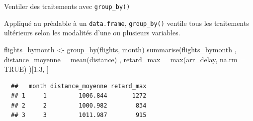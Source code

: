 \documentclass[12pt,ignorenonframetext,]{beamer}
\newenvironment{Shaded}{}{}
\newcommand{\DataTypeTok}[1]{#1}
\newcommand{\DecValTok}[1]{#1}
\newcommand{\KeywordTok}[1]{\textcolor[rgb]{0.00,0.00,1.00}{#1}}
\newcommand{\NormalTok}[1]{#1}
\newcommand{\OperatorTok}[1]{#1}
\newcommand{\OtherTok}[1]{\textcolor[rgb]{1.00,0.25,0.00}{#1}}
\newcommand{\StringTok}[1]{\textcolor[rgb]{0.00,0.50,0.50}{#1}}
\renewenvironment{Shaded}{\begin{snugshade}}{\end{snugshade}}
\begin{document}
\begin{frame}[fragile]{Ventiler des traitements avec
\texttt{group\_by()}}
\protect\hypertarget{ventiler-des-traitements-avec-group_by}{}

Appliqué au préalable à un \texttt{data.frame}, \texttt{group\_by()}
ventile tous les traitements ultérieurs selon les modalités d’une ou
plusieurs variables.

\begin{Shaded}
\begin{Highlighting}[]
\NormalTok{flights_bymonth <-}\StringTok{ }\KeywordTok{group_by}\NormalTok{(flights, month)}
\KeywordTok{summarise}\NormalTok{(flights_bymonth}
\NormalTok{  , }\DataTypeTok{distance_moyenne =} \KeywordTok{mean}\NormalTok{(distance)}
\NormalTok{  , }\DataTypeTok{retard_max =} \KeywordTok{max}\NormalTok{(arr_delay, }\DataTypeTok{na.rm =} \OtherTok{TRUE}\NormalTok{)}
\NormalTok{)[}\DecValTok{1}\OperatorTok{:}\DecValTok{3}\NormalTok{, ]}
\end{Highlighting}
\end{Shaded}

\begin{verbatim}
  ##   month distance_moyenne retard_max
  ## 1     1         1006.844       1272
  ## 2     2         1000.982        834
  ## 3     3         1011.987        915
\end{verbatim}

\end{frame}
\end{document}
